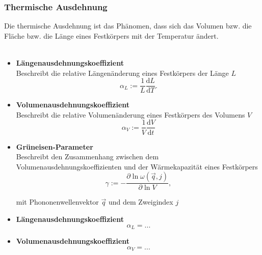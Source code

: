 \documentclass{article}
\newcommand{\diff}{\mathrm{d}}
\begin{document}
\newpage


\subsubsection{Thermische Ausdehnung}
Die thermische Ausdehnung ist das Phänomen, dass sich das Volumen bzw. die Fläche bzw. die Länge eines Festkörpers mit der Temperatur ändert.\\
\\
	\begin{itemize}
		\item \textbf{Längenausdehnungskoeffizient}\\
		Beschreibt die relative Längenänderung eines Festkörpers der Länge $L$
			\begin{equation}
				\alpha_L := \frac{1}{L} \frac{\diff L}{\diff T}.
			\end{equation}
		
		
		\item \textbf{Volumenausdehnungskoeffizient}\\
		Beschreibt die relative Volumenänderung eines Festkörpers des Volumens $V$
			\begin{equation}
				\alpha_V := \frac{1}{V} \frac{\diff V}{\diff t}
			\end{equation}
	\end{itemize}


	\begin{itemize}
		\item \textbf{Grüneisen-Parameter}\\
		Beschreibt den Zusammenhang zwischen dem Volumenausdehnungskoeffizienten und der Wärmekapazität eines Festkörpers
			\begin{equation}
				\gamma := -\frac{\partial \ln \omega(\vec{q},j)}{\partial \ln V},
			\end{equation}
		
		mit Phononenwellenvektor $\vec{q}$ und dem Zweigindex $j$
		
		
		\item \textbf{Längenausdehnungskoeffizient}
			\begin{equation}
				\alpha_L = ...
			\end{equation}
		
		
		\item \textbf{Volumenausdehnungskoeffizient}
			\begin{equation}
				\alpha_V = ...
			\end{equation}
	\end{itemize}
\end{document}
